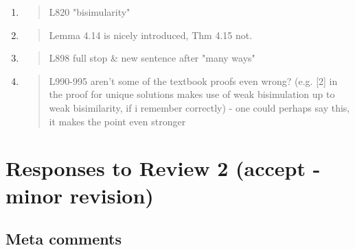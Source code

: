 \begin{enumerate}
\item \begin{quote}
    L820 "bisimularity"
  \end{quote}

\item \begin{quote}
    Lemma 4.14 is nicely introduced, Thm 4.15 not. 
  \end{quote}

\item \begin{quote}
    L898 full stop \& new sentence after "many ways"
  \end{quote}

\item \begin{quote}
    L990-995 aren't some of the textbook proofs even wrong? (e.g. [2]
    in the proof for unique solutions makes use of weak bisimulation
    up to weak bisimilarity, if i remember correctly) - one could
    perhaps say this, it makes the point even stronger
  \end{quote}

\end{enumerate}

\section*{Responses to Review 2 (accept - minor revision)}

\subsection*{Meta comments}

